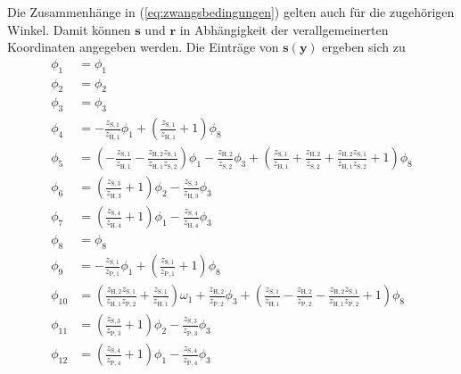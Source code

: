 Die Zusammenhänge in (\ref{eq:zwangsbedingungen}) gelten auch für die zugehörigen Winkel. Damit können $\pmb{s}$ und $\pmb{r}$ in Abhängigkeit der verallgemeinerten Koordinaten angegeben werden. Die Einträge von $\pmb{s}(\pmb{y})$ ergeben sich zu 
\begin{subequations}\label{eq:zwangsbedingungen_aufgelöst}
	\begin{align}
	 	\phi_1 &= \phi_1 \\
	 	\phi_2 &= \phi_2 \\
	 	\phi_3 &= \phi_3 \\ \label{eq:s4}
		\phi_{4} &= -\frac{z_{\mathrm{S,1}} }{z_{\mathrm{H,1}} } \phi_1 +\left(\frac{z_{\mathrm{S,1}} }{z_{\mathrm{H,1}} }+1\right) \phi_8 \\
		\phi_{5} &= \left(-\frac{z_\mathrm{S,1} }{z_\mathrm{H,1} }-\frac{z_\mathrm{H,2} z_\mathrm{S,1}}{z_\mathrm{H,1} z_\mathrm{S,2}} \right) \phi_1
			-\frac{z_\mathrm{H,2} }{z_\mathrm{S,2}} \phi_3
			+\left(\frac{z_{\mathrm{S,1}} }{z_{\mathrm{H,1}} }+\frac{z_{\mathrm{H,2}} }{z_{\mathrm{S,2}} }+\frac{z_{\mathrm{H,2}} z_{\mathrm{S,1}}}{z_{\mathrm{H,1}} z_{\mathrm{S,2}}} +1\right) \phi_8 \\
		\phi_{6} &= \left(\frac{z_{\mathrm{S,3}} }{z_{\mathrm{H,3}} }+1\right) \phi_2 - \frac{z_{\mathrm{S,3}} }{z_{\mathrm{H,3}} } \phi_3 \\
		\phi_{7} &= \left(\frac{z_{\mathrm{S,4}} }{z_{\mathrm{H,4}} }+1\right) \phi_1 - \frac{z_{\mathrm{S,4}} }{z_{\mathrm{H,4}} } \phi_3 \\
		\phi_8 &= \phi_8 \\
		\phi_{9} &= -\frac{z_{\mathrm{S,1}} }{z_\mathrm{P,1} } \phi_1 +\left(\frac{z_\mathrm{S,1} }{z_\mathrm{P,1}} +1\right) \phi_8 \\
		\phi_{10} &= \left(\frac{z_\mathrm{H,2} z_\mathrm{S,1}}{z_\mathrm{H,1} z_\mathrm{P,2}} + \frac{z_\mathrm{S,1}}{z_\mathrm{H,1}} \right) \omega_1
			+\frac{z_\mathrm{H,2}}{z_\mathrm{P,2}} \phi_3
			+\left(\frac{z_\mathrm{S,1}}{z_\mathrm{H,1}} -\frac{z_\mathrm{H,2} }{z_\mathrm{P,2} }-\frac{z_\mathrm{H,2}  z_\mathrm{S,1}}{z_\mathrm{H,1}  z_\mathrm{P,2}} + 1\right) \phi_8 \\
		\phi_{11} &= \left( \frac{z_{\mathrm{S,3}}}{z_{\mathrm{P,3}}} + 1 \right) \phi_2 -\frac{z_{\mathrm{S,3}}}{z_{\mathrm{P,3}}} \phi_3 \\
		\phi_{12} &= \left( \frac{z_{\mathrm{S,4}}}{z_{\mathrm{P,4}}} + 1 \right) \phi_1 -\frac{z_{\mathrm{S,4}}}{z_{\mathrm{P,4}}} \phi_3
	\end{align}
\end{subequations}
